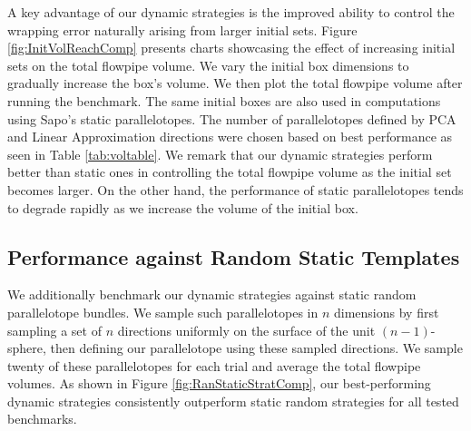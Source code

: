 A key advantage of our dynamic strategies is the improved ability to control the wrapping error naturally arising from larger initial sets. Figure \ref{fig:InitVolReachComp} presents charts showcasing the effect of increasing initial sets on the total flowpipe volume. We vary the initial box dimensions to gradually increase the box's volume. We then plot the total flowpipe volume after running the benchmark. The same initial boxes are also used in computations using Sapo's static parallelotopes. The number of parallelotopes defined by PCA and Linear Approximation directions were chosen based on best performance as seen in Table \ref{tab:voltable}. We remark that our dynamic strategies perform better than static ones in controlling the total flowpipe volume as the initial set becomes larger. On the other hand, the performance of static parallelotopes tends to degrade rapidly as we increase the volume of the initial box.

%


\subsection{Performance against Random Static Templates}
\label{sec:random_static}

We additionally benchmark our dynamic strategies against static random parallelotope bundles. We sample such parallelotopes in $n$ dimensions by first sampling a set of $n$ directions uniformly on the surface of the unit $(n-1)$-sphere, then defining our parallelotope using these sampled directions. We sample twenty of these parallelotopes for each trial and average the total flowpipe volumes. As shown in Figure \ref{fig:RanStaticStratComp}, our best-performing dynamic strategies consistently outperform static random strategies for all tested benchmarks.

%
